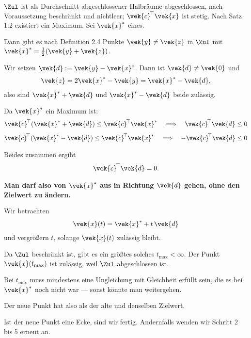 \begin{merksatz}
$\Zul$ ist als Durchschnitt abgeschlossener Halbräume abgeschlossen, nach Voraussetzung beschränkt und nichtleer; $\vek{c}^{\!\top}\vek{x}$ ist stetig. Nach Satz 1.2 existiert ein Maximum. Sei $\vek{x}^{*}$ eines.

Dann gibt es nach Definition 2.4 Punkte $\vek{y} \neq \vek{z}$ in $\Zul$ mit $\vek{x}^{*} = \frac12(\vek{y}+\vek{z})$.

Wir setzen $\vek{d} := \vek{y}-\vek{x}^{*}$. Dann ist $\vek{d} \neq \vek{0}$ und
\[ \vek{z} = 2\vek{x}^{*}-\vek{y} = \vek{x}^{*}-\vek{d} , \]
also sind $\vek{x}^{*}+\vek{d}$ und $\vek{x}^{*}-\vek{d}$ beide zulässig.

Da $\vek{x}^{*}$ ein Maximum ist:
\[ \vek{c}^{\!\top}(\vek{x}^{*}+\vek{d}) \le \vek{c}^{\!\top}\vek{x}^{*} \quad\Longrightarrow\quad \vek{c}^{\!\top}\vek{d} \le 0 \]
\[ \vek{c}^{\!\top}(\vek{x}^{*}-\vek{d}) \le \vek{c}^{\!\top}\vek{x}^{*} \quad\Longrightarrow\quad -\vek{c}^{\!\top}\vek{d} \le 0 \]

Beides zusammen ergibt
\[ \vek{c}^{\!\top}\vek{d} = 0 . \]

\begin{center}
\begin{minipage}{0.9\textwidth}
\textbf{Man darf also von $\vek{x}^{*}$ aus in Richtung $\vek{d}$ gehen, ohne den Zielwert zu ändern.}
\end{minipage}
\end{center}

Wir betrachten
\[ \vek{x}(t) = \vek{x}^{*} + t\,\vek{d} \]
und vergrößern $t$, solange $\vek{x}(t)$ zulässig bleibt.

Da $\Zul$ beschränkt ist, gibt es ein größtes solches $t_{\max} < \infty$. Der Punkt $\vek{x}(t_{\max})$ ist zulässig, weil $\Zul$ abgeschlossen ist.

Bei $t_{\max}$ muss mindestens eine Ungleichung mit Gleichheit erfüllt sein, die es bei $\vek{x}^{*}$ noch nicht war --- sonst könnte man weitergehen.

Der neue Punkt hat also  als der alte und denselben Zielwert.

Ist der neue Punkt eine Ecke, sind wir fertig. Andernfalls wenden wir Schritt 2 bis 5 erneut an.


\end{merksatz}
